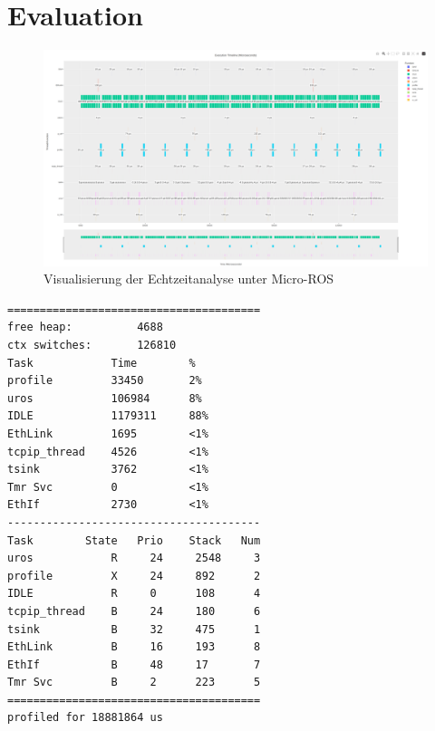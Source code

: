 \section{Evaluation}

\begin{figure}[h]
    \centering
    \includegraphics[width=1\textwidth]{assets/micro_ros_profiling}
    \caption{Visualisierung der Echtzeitanalyse unter Micro-ROS}
\end{figure}

\begin{code}
\begin{verbatim}
=======================================
free heap:          4688
ctx switches:       126810
Task            Time        %
profile         33450       2%
uros            106984      8%
IDLE            1179311     88%
EthLink         1695        <1%
tcpip_thread    4526        <1%
tsink           3762        <1%
Tmr Svc         0           <1%
EthIf           2730        <1%
---------------------------------------
Task        State   Prio    Stack   Num
uros            R     24     2548     3
profile         X     24     892      2
IDLE            R     0      108      4
tcpip_thread    B     24     180      6
tsink           B     32     475      1
EthLink         B     16     193      8
EthIf           B     48     17       7
Tmr Svc         B     2      223      5
=======================================
profiled for 18881864 us
\end{verbatim}
\end{code}


